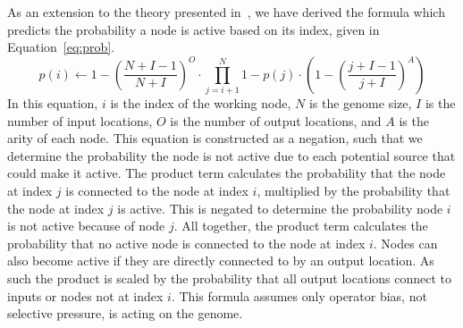\documentclass[journal]{IEEEtran}
\begin{document}
As an extension to the theory presented in~\cite{goldman:2013:ordering}, we have
derived the formula which predicts the probability a node is active based on its
index, given in Equation~\ref{eq:prob}.
\begin{equation}
p(i) \leftarrow 1 - (\frac{N+I-1}{N+I})^O \cdot \prod_{j=i+1}^{N} 1 - p(j) \cdot (1-(\frac{j+I-1}{j+I})^A)
\label{eq:prob}
\end{equation}
In this equation, $i$ is the index of the working node, $N$ is the genome size, $I$ is the number of input locations,
$O$ is the number of output locations, and $A$ is the arity of each node.
This equation is constructed as a negation, such that we determine the probability
the node is not active due to each potential source that could make it active.
The product term calculates the probability that the node at index $j$ is connected to the
node at index $i$, multiplied by the probability that the node at index $j$ is active.  This is
negated to determine the probability node $i$ is not active because of node $j$.
All together, the product term calculates the probability that no active node is
connected to the node at index $i$.  Nodes can also become active if they are directly
connected to by an output location.  As such the product is scaled by the probability
that all output locations connect to inputs or nodes not at index $i$.  This
formula assumes only operator bias, not selective pressure, is acting on the
genome.
\end{document}
